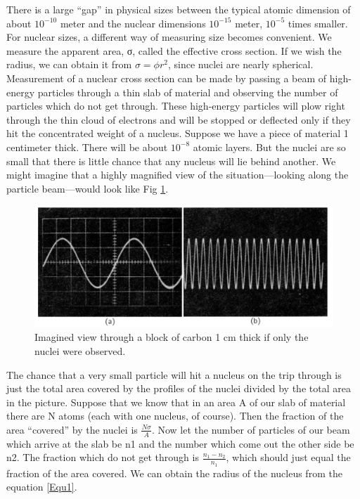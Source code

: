 \documentclass{article}
\begin{document}
	There is a large “gap” in physical sizes between the typical atomic dimension of about $10^{-10}$ meter and the nuclear dimensions $10^{-15}$ meter, $10^{-5}$ times smaller. For nuclear sizes, a different way of measuring size becomes convenient. We measure the apparent area, σ, called the effective cross section. If we wish the radius, we can obtain it from $\sigma = \phi r^{2}$, since nuclei are nearly spherical.\\

	Measurement of a nuclear cross section can be made by passing a beam of high-energy particles through a thin slab of material and observing the number of particles which do not get through. These high-energy particles will plow right through the thin cloud of electrons and will be stopped or deflected only if they hit the concentrated weight of a nucleus. Suppose we have a piece of material 1 centimeter thick. There will be about $10^{-8}$ atomic layers. But the nuclei are so small that there is little chance that any nucleus will lie behind another. We might imagine that a highly magnified view of the situation—looking along the particle beam—would look like Fig \ref{Fi: Img60}.\\ 

	\begin{figure}[h]
	\centering
		\includegraphics[scale=2.0]{img2.png}
		\caption{Imagined view through a block of carbon 1 cm thick if only the nuclei were observed.}
		\label{Fi: Img60}
	\end{figure}

	The chance that a very small particle will hit a nucleus on the trip through is just the total area covered by the profiles of the nuclei divided by the total area in the picture. Suppose that we know that in an area A of our slab of material there are N atoms (each with one nucleus, of course). Then the fraction of the area “covered” by the nuclei is $\frac{N \sigma}{A}$. Now let the number of particles of our beam which arrive at the slab be n1 and the number which come out the other side be n2. The fraction which do not get through is $\frac{n_{1} - n_{2}}{n_{1}}$, which should just equal the fraction of the area covered. We can obtain the radius of the nucleus from the equation \ref{Equ1}.\\
\end{document}

